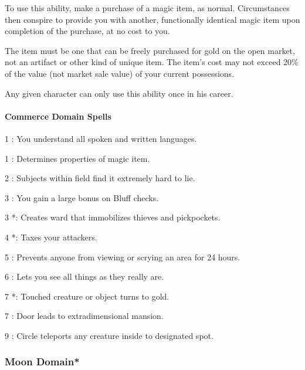 To use this ability, make a purchase of a magic item, as normal. Circumstances then conspire to provide you with another, functionally identical magic item upon completion of the purchase, at no cost to you.

The item must be one that can be freely purchased for gold on the open market, not an artifact or other kind of unique item. The item's cost may not exceed 20\% of the value (not market sale value) of your current possessions.

Any given character can only use this ability once in his career.
\paragraph{Commerce Domain Spells}
\begin{list}{}{\leftmargin=1em}
\item[1] : You understand all spoken and written languages.
\item[1] : Determines properties of magic item.
\item[2] : Subjects within field find it extremely hard to lie.
\item[3] : You gain a large bonus on Bluff checks.
\item[3] *: Creates ward that immobilizes thieves and pickpockets.
\item[4] *: Taxes your attackers.
\item[5] : Prevents anyone from viewing or scrying an area for 24 hours.
\item[6] : Lets you see all things as they really are.
\item[7] *: Touched creature or object turns to gold.
\item[7] : Door leads to extradimensional mansion.
\item[9] : Circle teleports any creature inside to designated spot.
\end{list}
\subsubsection[Moon Domain]{Moon Domain*}
